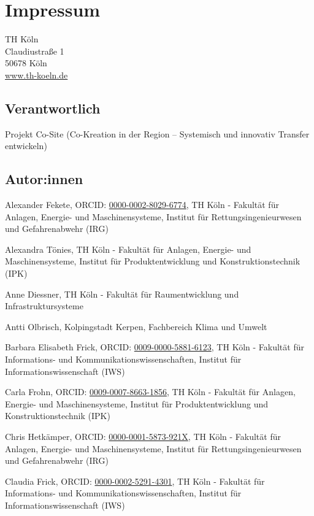 \documentclass[
  letterpaper,
  DIV=11,
  numbers=noendperiod]{scrartcl}
\author{}
\date{}
\begin{document}
\section{Impressum}\label{impressum}

TH Köln\\
Claudiustraße 1\\
50678 Köln\\
\href{https://www.th-koeln.de}{www.th-koeln.de}

\subsection{Verantwortlich}\label{verantwortlich}

Projekt Co-Site (Co-Kreation in der Region -- Systemisch und innovativ
Transfer entwickeln)

\subsection{Autor:innen}\label{autorinnen}

Alexander Fekete, ORCID:
\href{https://orcid.org/0000-0002-8029-6774}{0000-0002-8029-6774}, TH
Köln - Fakultät für Anlagen, Energie- und Maschinensysteme, Institut für
Rettungsingenieurwesen und Gefahrenabwehr (IRG)

Alexandra Tönies, TH Köln - Fakultät für Anlagen, Energie- und
Maschinensysteme, Institut für Produktentwicklung und
Konstruktionstechnik (IPK)

Anne Diessner, TH Köln - Fakultät für Raumentwicklung und
Infrastruktursysteme

Antti Olbrisch, Kolpingstadt Kerpen, Fachbereich Klima und Umwelt

Barbara Elisabeth Frick, ORCID:
\href{https://orcid.org/0009-0000-5881-6123}{0009-0000-5881-6123}, TH
Köln - Fakultät für Informations- und Kommunikationswissenschaften,
Institut für Informationswissenschaft (IWS)

Carla Frohn, ORCID:
\href{https://orcid.org/0009-0007-8663-1856}{0009-0007-8663-1856}, TH
Köln - Fakultät für Anlagen, Energie- und Maschinensysteme, Institut für
Produktentwicklung und Konstruktionstechnik (IPK)

Chris Hetkämper, ORCID:
\href{https://orcid.org/0000-0001-5873-921X}{0000-0001-5873-921X}, TH
Köln - Fakultät für Anlagen, Energie- und Maschinensysteme, Institut für
Rettungsingenieurwesen und Gefahrenabwehr (IRG)

Claudia Frick, ORCID:
\href{https://orcid.org/0000-0002-5291-4301}{0000-0002-5291-4301}, TH
Köln - Fakultät für Informations- und Kommunikationswissenschaften,
Institut für Informationswissenschaft (IWS)
\end{document}
